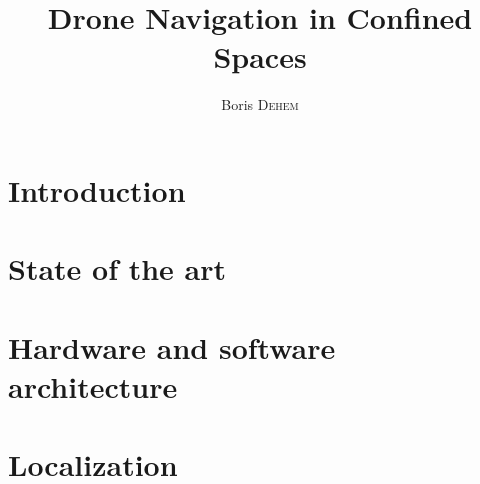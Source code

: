 \documentclass{eplmastersthesis}
\title{Drone Navigation in Confined Spaces}
\author{Boris \textsc{Dehem}}
\begin{document}






\tableofcontents

\printglossaries
\newpage
{}
\chapter{Introduction}


\chapter{State of the art}


\chapter{Hardware and software architecture}


\chapter{Localization}

\end{document}
